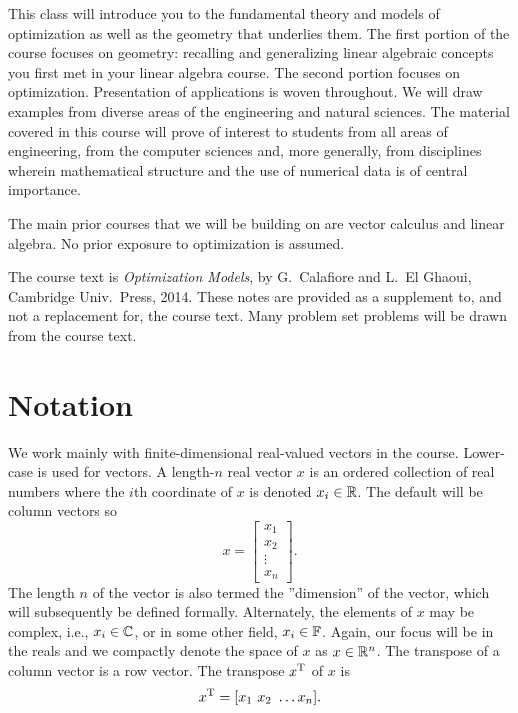 
This class will introduce you to the fundamental theory and models of
optimization as well as the geometry that underlies them.  The first
portion of the course focuses on geometry: recalling and generalizing
linear algebraic concepts you first met in your linear algebra course.
The second portion focuses on optimization.  Presentation of
applications is woven throughout.  We will draw examples from diverse
areas of the engineering and natural sciences.  The material covered
in this course will prove of interest to students from all areas of
engineering, from the computer sciences and, more generally, from
disciplines wherein mathematical structure and the use of numerical
data is of central importance.

The main prior courses that we will be building on are vector
calculus and linear algebra.  No prior exposure to optimization is assumed.

The course text is {\em Optimization Models}, by G.~Calafiore and
L.~El Ghaoui, Cambridge Univ.~Press, 2014.  These notes are provided
as a supplement to, and not a replacement for, the course text.  Many problem set problems will be drawn from the course text.

\section*{Notation}

We work mainly with finite-dimensional real-valued vectors in the
course.  Lower-case is used for vectors.  A length-$n$ real vector $x$
is an ordered collection of real numbers where the $i$th coordinate of
$x$ is denoted $x_i \in \mathbb{R}$. The default will be column vectors
so
\begin{equation*}
x = \left[ \begin{array}{c} x_1 \\ x_2 \\ \vdots \\ x_n\end{array} \right].
\end{equation*}
The length $n$ of the vector is also termed the ''dimension'' of the vector, which will subsequently be defined formally.  Alternately, the elements of $x$ may be complex, i.e., $x_i \in \mathbb{C}$, or in some other field, $x_i \in \mathbb{F}$.  Again, our focus will be in the reals and we compactly denote the space of $x$ as $x \in \mathbb{R}^n$.
The transpose of a column vector is a row vector. The transpose $x^{\rm T}$ of $x$ is
\begin{equation*}
x^{\rm T} = [ x_1 \ x_2 \ \ldots x_n].
\end{equation*}


